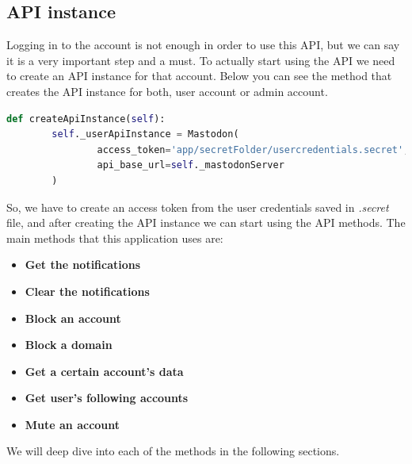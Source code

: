 \subsection{API instance}\label{ss:api_instance}
Logging in to the account is not enough in order to use this API, but we can say it is a very important step and a must. To actually start using the API we need to create an API instance for that account. Below you can see the method that creates the API instance for both, user account or admin account.
\\[5pt]
\begin{lstlisting}[language=python, caption={Creating API instance}, captionpos=b]
	def createApiInstance(self):
		self._userApiInstance = Mastodon(
				access_token='app/secretFolder/usercredentials.secret',
				api_base_url=self._mastodonServer
		)
\end{lstlisting}
So, we have to create an access token from the user credentials saved in \textit{.secret} file, and after creating the API instance we can start using the API methods. The main methods that this application uses are:
\begin{itemize}
	\item \textbf{Get the notifications}
	\item \textbf{Clear the notifications}
	\item \textbf{Block an account}
	\item \textbf{Block a domain}
	\item \textbf{Get a certain account's data}
	\item \textbf{Get user's following accounts}
	\item \textbf{Mute an account}
\end{itemize}
We will deep dive into each of the methods in the following sections.
